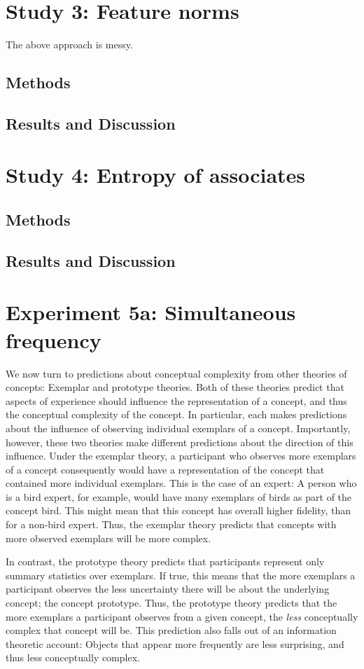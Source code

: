\section{Study 3: Feature norms}
The above approach is messy. 

\subsection{Methods}
\subsection{Results and Discussion}

\section{Study 4: Entropy of associates}
\subsection{Methods}

\subsection{Results and Discussion}

\section{Experiment 5a: Simultaneous frequency}
We now turn to predictions about conceptual complexity from other theories of concepts: Exemplar and prototype theories. Both of these theories predict that aspects of experience should influence the representation of a concept, and thus the conceptual complexity of the concept. In particular, each makes predictions about the influence of observing individual exemplars of a concept.  Importantly, however, these two theories make different predictions about the direction of this influence. Under the exemplar theory, a participant who observes more exemplars of a concept consequently would have a representation of the concept that contained more individual exemplars. This is the case of an expert: A person who is a bird expert, for example, would have many exemplars of birds as part of the concept bird. This might mean that this concept has overall higher fidelity, than for a non-bird expert. Thus, the exemplar theory predicts that concepts with more observed exemplars will be more complex.

In contrast, the prototype theory predicts that participants represent only summary statistics over exemplars. If true, this means that the more exemplars a participant observes the less uncertainty there will be about the underlying concept; the concept prototype. Thus, the prototype theory predicts that the more exemplars a participant observes from a given concept, the {\it less} conceptually complex that concept will be. This prediction also falls out of an information theoretic account: Objects that appear more frequently are less surprising, and thus less conceptually complex.

